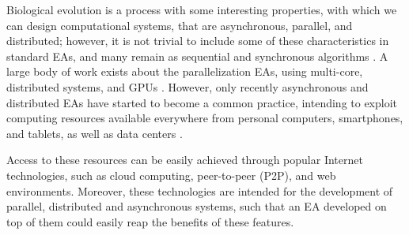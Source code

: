 \documentclass[conference]{IEEEtran}
\begin{document}
Biological evolution is a process with some interesting properties,
with which we can design computational systems, that are asynchronous,
parallel, and distributed;
however, it is not trivial to include some of these characteristics in standard
EAs, and many remain as sequential and synchronous algorithms \cite{eiben}.
A large body of work exists about the parallelization EAs, using multi-core, 
distributed systems, and GPUs \cite{cantu2000efficient,hofmann2013performance}.
However, only recently asynchronous and distributed EAs have started to become
a common practice, intending to exploit computing resources available everywhere
from personal computers, smartphones, and tablets, as well as data 
centers \cite{agajaj,FlexGP}. 

Access to these resources can be easily achieved through popular Internet 
technologies, such as cloud computing, peer-to-peer (P2P), and web environments. 
Moreover, these technologies are intended for the
development of parallel, distributed and asynchronous systems, such
that an EA developed on top of them could easily reap the benefits of
these features.
\end{document}
